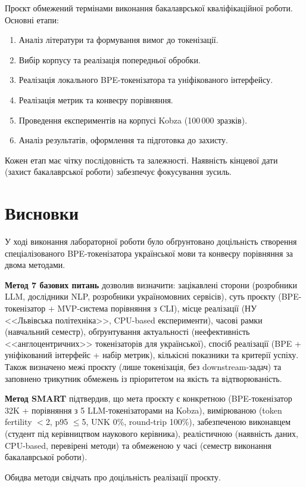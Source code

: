 \documentclass[14pt]{extarticle}
\begin{document}
Проєкт обмежений термінами виконання бакалаврської кваліфікаційної роботи. Основні етапи:
\begin{enumerate}
  \item Аналіз літератури та формування вимог до токенізації.
  \item Вибір корпусу та реалізація попередньої обробки.
  \item Реалізація локального BPE-токенізатора та уніфікованого інтерфейсу.
  \item Реалізація метрик та конвеєру порівняння.
  \item Проведення експериментів на корпусі Kobza (100\,000 зразків).
  \item Аналіз результатів, оформлення та підготовка до захисту.
\end{enumerate}

Кожен етап має чітку послідовність та залежності. Наявність кінцевої дати (захист бакалаврської роботи) забезпечує фокусування зусиль.

\section*{Висновки}

У ході виконання лабораторної роботи було обґрунтовано доцільність створення спеціалізованого BPE-токенізатора української мови та конвеєру порівняння за двома методами.

\textbf{Метод 7 базових питань} дозволив визначити: зацікавлені сторони (розробники LLM, дослідники NLP, розробники україномовних сервісів), суть проєкту (BPE-токенізатор + MVP-система порівняння з CLI), місце реалізації (НУ <<Львівська політехніка>>, CPU-based експерименти), часові рамки (навчальний семестр), обґрунтування актуальності (неефективність <<англоцентричних>> токенізаторів для української), спосіб реалізації (BPE + уніфікований інтерфейс + набір метрик), кількісні показники та критерії успіху. Також визначено межі проєкту (лише токенізація, без downstream-задач) та заповнено трикутник обмежень із пріоритетом на якість та відтворюваність.

\textbf{Метод SMART} підтвердив, що мета проєкту є конкретною (BPE-токенізатор 32K + порівняння з 5 LLM-токенізаторами на Kobza), вимірюваною (token fertility $<$2, p95 $\leq$5, UNK 0\%, round-trip 100\%), забезпеченою виконавцем (студент під керівництвом наукового керівника), реалістичною (наявність даних, CPU-based, перевірені методи) та обмеженою у часі (семестр виконання бакалаврської роботи).

Обидва методи свідчать про доцільність реалізації проєкту.
\end{document}

